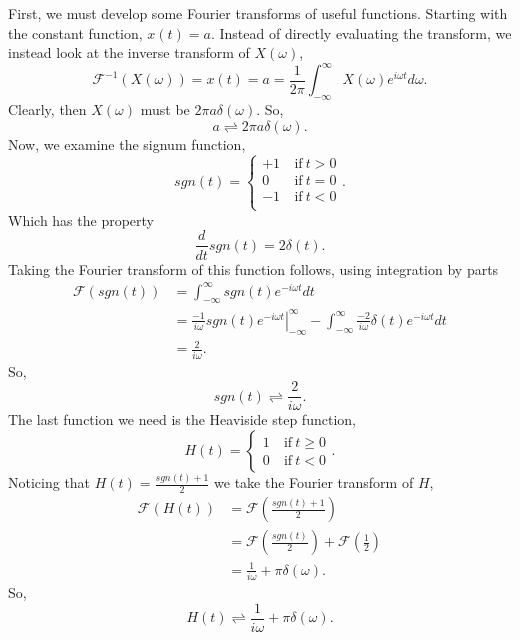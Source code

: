 \documentclass[12pt]{article}
\begin{document}
First, we must develop some Fourier transforms of useful functions. Starting with the constant function, $x(t)=a$. Instead of directly evaluating the transform, we instead look at the inverse transform of $X(\omega)$,
\begin{equation*}
\mathcal{F}^{-1}(X(\omega))=x(t)=a=\frac{1}{2\pi}\int_{-\infty}^{\infty}X(\omega)e^{i\omega t}d\omega.
\end{equation*}
Clearly, then $X(\omega)$ must be $2\pi a\delta(\omega)$. So,
\begin{equation}
a\rightleftharpoons 2\pi a\delta(\omega).
\end{equation}
Now, we examine the signum function,
\begin{equation}
\mathit{sgn}(t) =
    \begin{cases}
    +1~&\mathrm{if}~t>0 \\
    0~&\mathrm{if}~t=0  \\
    -1~&\mathrm{if}~t<0 \\
    \end{cases}.
\end{equation}
Which has the property
\begin{equation}
\frac{d}{dt}\mathit{sgn}(t) = 2\delta(t).
\end{equation}
Taking the Fourier transform of this function follows, using integration by parts
\begin{equation*}
\begin{aligned}
\mathcal{F}(\mathit{sgn}(t))&= \int_{-\infty}^{\infty}\mathit{sgn}(t)e^{-i\omega t}dt \\
&= \left.\frac{-1}{i\omega}\mathit{sgn}(t)e^{-i\omega t}\right|_{-\infty}^{\infty} - \int_{-\infty}^{\infty}\frac{-2}{i\omega}\delta(t)e^{-i\omega t}dt \\
&= \frac{2}{i\omega}.
\end{aligned}
\end{equation*}
So,
\begin{equation}
\mathit{sgn}(t)\rightleftharpoons\frac{2}{i\omega}.
\end{equation}
The last function we need is the Heaviside step function,
\begin{equation}
H(t) =
    \begin{cases}
    1~&\mathrm{if}~t\geq0 \\
    0~&\mathrm{if}~t<0
    \end{cases}.
\end{equation}
Noticing that $H(t)=\frac{\mathit{sgn}(t)+1}{2}$ we take the Fourier transform of $H$,
\begin{equation*}
\begin{aligned}
\mathcal{F}(H(t))&=\mathcal{F}\left(\frac{\mathit{sgn}(t)+1}{2}\right) \\
&=\mathcal{F}\left(\frac{\mathit{sgn}(t)}{2}\right)+\mathcal{F}\left(\frac{1}{2}\right) \\
&= \frac{1}{i\omega}+\pi\delta(\omega).
\end{aligned}
\end{equation*}
So,
\begin{equation}
H(t)\rightleftharpoons\frac{1}{i\omega}+\pi\delta(\omega).
\end{equation}
\end{document}
